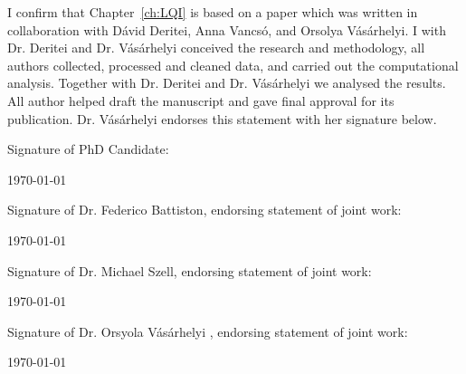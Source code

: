 \documentclass[a4paper,twoside,12pt]{book}
\begin{document}
\vspace{.2cm}

\noindent
I confirm that Chapter~\ref{ch:LQI} is based on a paper which was written in collaboration with D\'avid Deritei, Anna Vancs\'o, and Orsolya V\'as\'arhelyi. I with Dr. Deritei and Dr. V\'as\'arhelyi conceived the research and methodology, all authors collected, processed and cleaned data, and carried out the computational analysis. Together with Dr. Deritei and Dr. V\'as\'arhelyi we analysed the results. All author helped draft the manuscript and gave final approval for its publication. Dr. V\'as\'arhelyi endorses this statement with her signature below.

\vspace{0.5cm}
\noindent
Signature of PhD Candidate:

\vspace{2cm}
\noindent
\monthyeardate\today


\vspace{3.5cm}
\noindent
Signature of Dr. Federico Battiston, endorsing statement of joint work:

\vspace{2cm}
\noindent
\monthyeardate\today


\vspace{3.5cm}
\noindent
Signature of Dr. Michael Szell, endorsing statement of joint work:

\vspace{2cm}
\noindent
\monthyeardate\today

\vspace{3.5cm}
\noindent
Signature of Dr. Orsyola V\'as\'arhelyi , endorsing statement of joint work:

\vspace{2cm}
\noindent
\monthyeardate\today
\end{document}
